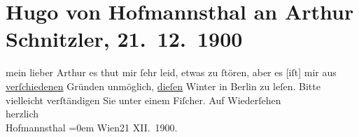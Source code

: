 

         
         \renewcommand{\erwaehntePersonen}{Personen: Samuel Fischer, Hugo von Hofmannsthal}
         \renewcommand{\erwaehnteOrte}{Orte: Berlin, Wien}
         \renewcommand{\erwaehnteWerke}{}
               \section[Hugo von Hofmannsthal an Arthur Schnitzler, 21. 12. 1900]{ Hugo von Hofmannsthal an Arthur Schnitzler, 21. 12. 1900}\nopagebreak{}\rehead{ }\begin{ledgroupsized}[t]{13cm}\normalsize\beginnumbering \toendnotes[C]{\smallbreak\pagebreak[2]} 
\pstart{}{\pb}mein lieber Arthur\pend\pstart
           es thut mir ſehr leid, etwas zu ſtören, aber es {[}iſt{]} mir aus \uline{verſchiedenen} Gründen unmöglich, \uline{dieſen} Winter in Berlin zu leſen.
               Bitte vielleicht verſtändigen Sie unter einem Fiſcher.\pend
           \pstart
           Auf Wiederſehen{\\[\baselineskip]}herzlich{\\[\baselineskip]}\spacefill\mbox{Hofmannsthal}\pend
           \leftskip=0em{}\pstart
           \noindent{}Wien21 XII. 1900.\pend
           
         
         \endnumbering{}\end{ledgroupsized}  \newcommand{\dateiname}{L01087}\newcommand{\titel}{Hugo von Hofmannsthal an Arthur Schnitzler, 21. 12. 1900}\newcommand{\editorInnen}{Martin Anton Müller und Gerd-Hermann Susen}
      